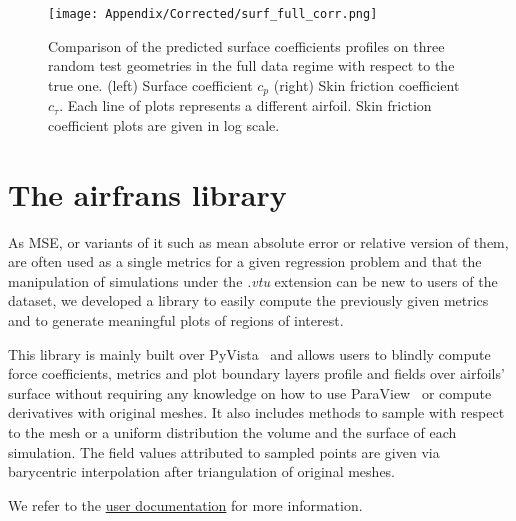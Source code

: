 \begin{figure}
	\centering
	\texttt{[image: Appendix/Corrected/surf\_full\_corr.png]}
	\caption[Comparison of the predicted surface coefficients profiles.]{Comparison of the predicted surface coefficients profiles on three random test geometries in the full data regime with respect to the true one. (left) Surface coefficient $c_p$ (right) Skin friction coefficient $c_\tau$. Each line of plots represents a different airfoil. Skin friction coefficient plots are given in log scale.}
	\label{fig:surf_full_corr}
\end{figure}

\section{The airfrans library}
As \acrshort{MSE}, or variants of it such as mean absolute error or relative version of them, are often used as a single metrics for a given regression problem and that the manipulation of simulations under the \emph{.vtu} extension can be new to users of the dataset, we developed a library to easily compute the previously given metrics and to generate meaningful plots of regions of interest.

This library is mainly built over PyVista~\cite{pyvista} and allows users to blindly compute force coefficients, metrics and plot boundary layers profile and fields over airfoils' surface without requiring any knowledge on how to use ParaView~\cite{paraview} or compute derivatives with original meshes. It also includes methods to sample with respect to the mesh or a uniform distribution the volume and the surface of each simulation. The field values attributed to sampled points are given via barycentric interpolation after triangulation of original meshes.

We refer to the \href{https://airfrans.readthedocs.io/en/latest/index.html}{user documentation} for more information.

